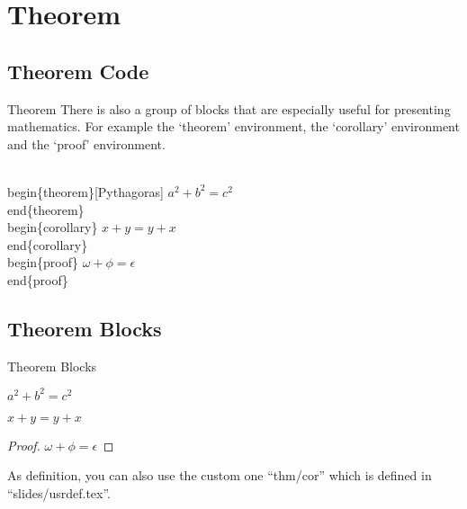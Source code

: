 \section{Theorem}
\subsection{Theorem Code}
\label{theoremCode}
\begin{frame}{Theorem}
  There is also a group of blocks that are especially useful for presenting mathematics. For example the ‘theorem’ environment, the ‘corollary’ environment and the ‘proof’ environment.
  \begin{semiverbatim}
    \\begin\{theorem\}[Pythagoras] \newline
      $ a^2 + b^2 = c^2$ \newline
    \\end\{theorem\} \newline
    \\begin\{corollary\} \newline
      $ x + y = y + x  $ \newline
    \\end\{corollary\} \newline
    \\begin\{proof\} \newline
      $\omega +\phi = \epsilon $ \newline
    \\end\{proof\}
  \end{semiverbatim}
\end{frame}

\subsection{Theorem Blocks}
\label{theoremBlocks}
\begin{frame}{Theorem Blocks}
  \begin{theorem}[Pythagoras]
    $ a^2 + b^2 = c^2$
  \end{theorem}
  \begin{corollary}
    $ x + y = y + x  $
  \end{corollary}
  \begin{proof}
    $\omega +\phi = \epsilon $
  \end{proof}
  As definition, you can also use the custom one ``thm/cor'' which is defined in ``slides/usrdef.tex''.
\end{frame}
